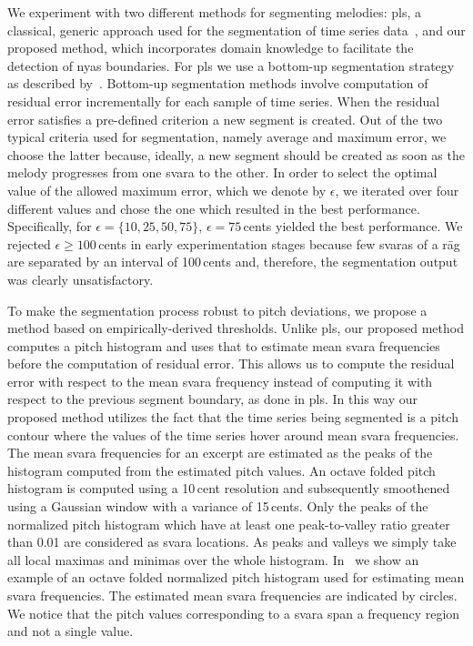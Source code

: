 {We experiment with two different methods for segmenting melodies: \gls{pls}, a classical, generic approach used for the segmentation of time series data~\citep{keogh2004segmenting}, and our proposed method, which incorporates domain knowledge to facilitate the detection of \gls{nyas} boundaries. For \gls{pls} we use a bottom-up segmentation strategy as described by~\cite{keogh2004segmenting}. Bottom-up segmentation methods involve computation of residual error incrementally for each sample of time series. When the residual error satisfies a pre-defined criterion a new segment is created. Out of the two typical criteria used for segmentation, namely average and maximum error, we choose the latter because, ideally, a new segment should be created as soon as the melody progresses from one \gls{svara} to the other. In order to select the optimal value of the allowed maximum error, which we denote by $\epsilon$, we iterated over four different values and chose the one which resulted in the best performance. Specifically, for $\epsilon=\lbrace 10, 25, 50, 75\rbrace$, $\epsilon=75$\,cents yielded the best performance. We rejected $\epsilon\geq 100$\,cents in early experimentation stages because few \glspl{svara} of a r\={a}g are separated by an interval of 100\,cents and, therefore, the segmentation output was clearly unsatisfactory.

To make the segmentation process robust to pitch deviations, we propose a method based on empirically-derived thresholds. Unlike \gls{pls}, our proposed method computes a pitch histogram and uses that to estimate mean \gls{svara} frequencies before the computation of residual error. This allows us to compute the residual error with respect to the mean \gls{svara} frequency instead of computing it with respect to the previous segment boundary, as done in \gls{pls}.  In this way our proposed method utilizes the fact that the time series being segmented is a pitch contour where the values of the time series hover around mean \gls{svara} frequencies. The mean \gls{svara} frequencies for an excerpt are estimated as the peaks of the histogram computed from the estimated pitch values. An octave folded pitch histogram is computed using a 10\,cent resolution and subsequently smoothened using a Gaussian window with a variance of 15\,cents. Only the peaks of the normalized pitch histogram which have at least one peak-to-valley ratio greater than 0.01 are considered as \gls{svara} locations. As peaks and valleys we simply take all local maximas and minimas over the whole histogram. In~ we show an example of an octave folded normalized  pitch histogram used for estimating mean \gls{svara} frequencies. The estimated mean \gls{svara} frequencies are indicated by circles. We notice that the pitch values corresponding to a \gls{svara} span a frequency region and not a single value.


}
